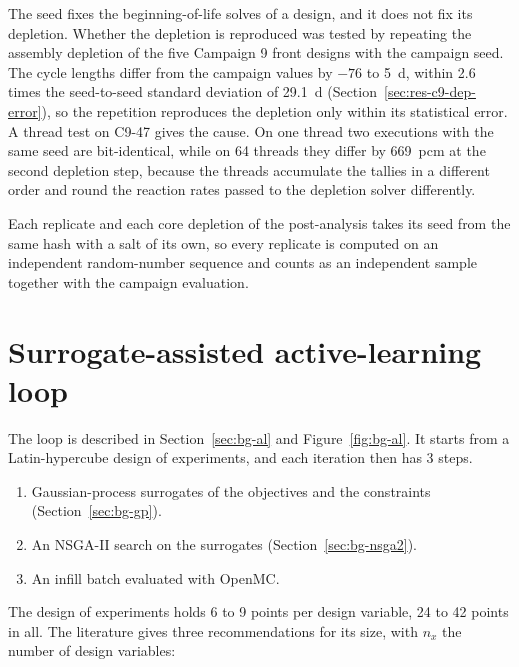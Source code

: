 The seed fixes the beginning-of-life solves of a design, and it does
not fix its depletion. Whether the depletion is reproduced was tested
by repeating the assembly depletion of the five Campaign 9 front
designs with the campaign seed. The cycle lengths differ from the
campaign values by $-76$ to \SI{+5}{d}, within 2.6 times the
seed-to-seed standard deviation of \SI{29.1}{d}
(Section~\ref{sec:res-c9-dep-error}), so the repetition reproduces the
depletion only within its statistical error. A thread test on C9-47 gives
the cause. On one thread two executions with the same seed are
bit-identical, while on 64 threads they differ by \SI{669}{pcm} at the
second depletion step, because the threads accumulate the tallies in a
different order and round the reaction rates passed to the depletion
solver differently.

Each replicate and each core depletion of the post-analysis takes its
seed from the same hash with a salt of its own, so every replicate is
computed on an independent random-number sequence and counts as an
independent sample together with the campaign evaluation.

\label{sec:meth-cycle-error}\label{sec:meth-stats}\label{eq:noise-margin-set}

\section{Surrogate-assisted active-learning loop}
\label{sec:meth-loop}

The loop is described in Section~\ref{sec:bg-al} and
Figure~\ref{fig:bg-al}. It starts from a Latin-hypercube design of
experiments, and each iteration then has 3 steps.

\begin{enumerate}
  \item Gaussian-process surrogates of the objectives and the
        constraints (Section~\ref{sec:bg-gp}).

  \item An NSGA-II search on the surrogates
        (Section~\ref{sec:bg-nsga2}).

  \item An infill batch evaluated with OpenMC.
\end{enumerate}

The design of experiments holds 6 to 9 points per design variable, 24
to 42 points in all. The literature gives three recommendations for its
size, with $n_x$ the number of design variables:

